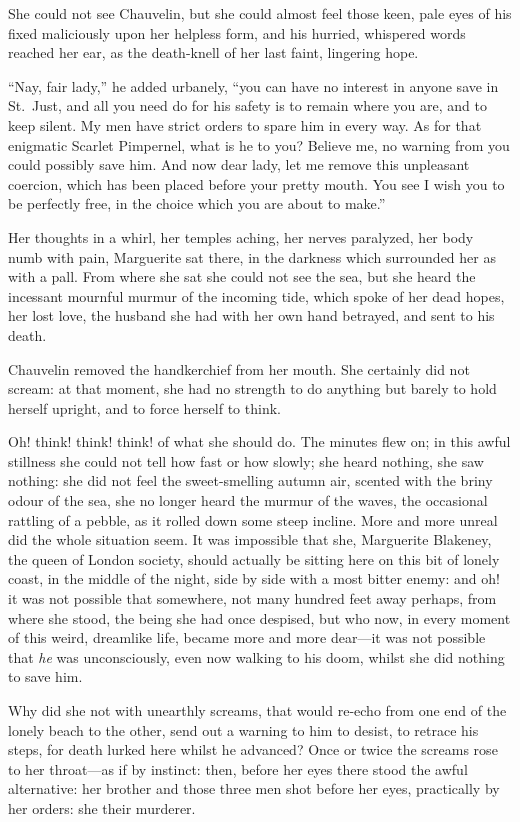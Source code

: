 \documentclass[paper=a5,BCOR=7mm,twoside,DIV=calc,12pt,usegeometry,chapterprefix,endperiod,headings=big]{scrbook}
\begin{document}
She could not see Chauvelin, but she could almost feel those keen, pale eyes of his fixed maliciously upon her helpless form, and his hurried, whispered words reached her ear, as the death-knell of her last faint, lingering hope.

\enquote{Nay, fair lady,} he added urbanely, \enquote{you can have no interest in anyone save in St.~Just, and all you need do for his safety is to remain where you are, and to keep silent. My men have strict orders to spare him in every way. As for that enigmatic Scarlet Pimpernel, what is he to you? Believe me, no warning from you could possibly save him. And now dear lady, let me remove this unpleasant coercion, which has been placed before your pretty mouth. You see I wish you to be perfectly free, in the choice which you are about to make.}

Her thoughts in a whirl, her temples aching, her nerves paralyzed, her body numb with pain, Marguerite sat there, in the darkness which surrounded her as with a pall. From where she sat she could not see the sea, but she heard the incessant mournful murmur of the incoming tide, which spoke of her dead hopes, her lost love, the husband she had with her own hand betrayed, and sent to his death.

Chauvelin removed the handkerchief from her mouth. She certainly did not scream: at that moment, she had no strength to do anything but barely to hold herself upright, and to force herself to think.

Oh! think! think! think! of what she should do. The minutes flew on; in this awful stillness she could not tell how fast or how slowly; she heard nothing, she saw nothing: she did not feel the sweet-smelling autumn air, scented with the briny odour of the sea, she no longer heard the murmur of the waves, the occasional rattling of a pebble, as it rolled down some steep incline. More and more unreal did the whole situation seem. It was impossible that she, Marguerite Blakeney, the queen of London society, should actually be sitting here on this bit of lonely coast, in the middle of the night, side by side with a most bitter enemy: and oh! it was not possible that somewhere, not many hundred feet away perhaps, from where she stood, the being she had once despised, but who now, in every moment of this weird, dreamlike life, became more and more dear---it was not possible that \textit{he} was unconsciously, even now walking to his doom, whilst she did nothing to save him.

Why did she not with unearthly screams, that would re-echo from one end of the lonely beach to the other, send out a warning to him to desist, to retrace his steps, for death lurked here whilst he advanced? Once or twice the screams rose to her throat---as if by instinct: then, before her eyes there stood the awful alternative: her brother and those three men shot before her eyes, practically by her orders: she their murderer.
\end{document}
